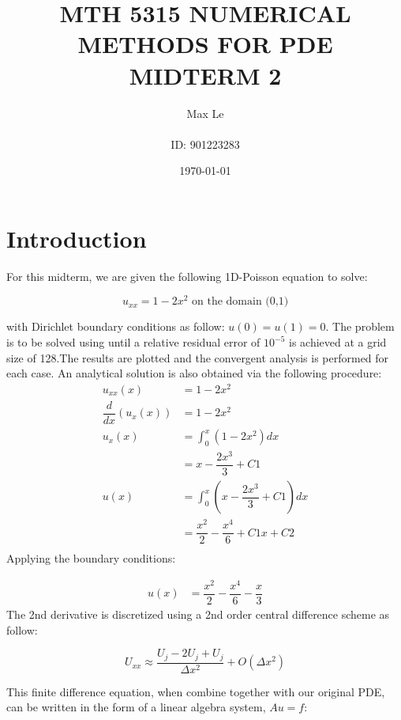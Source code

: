 \documentclass{article}
\title{MTH 5315 NUMERICAL METHODS FOR PDE \\ MIDTERM 2}
\date{\today}
\author{\Huge Max Le \\ \\ ID: 901223283}
\begin{document}
\maketitle
\newpage
\tableofcontents
\newpage
\listoffigures

\newpage
\section{Introduction}
For this midterm, we are given the following 1D-Poisson equation to solve:

\begin{equation}
u_{xx} = 1-2x^2 \textrm{ on the domain (0,1)}
\end{equation}

\noindent
with Dirichlet boundary conditions as follow: $u(0) = u(1) = 0$. The problem is to be solved using until a relative residual error of $10^{-5}$ is achieved at a grid size of 128.The results are plotted and the convergent analysis is performed for each case. An analytical solution is also obtained via the following procedure:
\begin{align*}
u_{xx}(x) &= 1-2x^2 \\
\dfrac{d}{dx}(u_x(x))&= 1-2x^2\\
u_x(x)&= \int_{0}^{x} (1-2x^2) dx\\
&=x-\dfrac{2x^3}{3}+C1\\
u(x) &= \int_{0}^{x} (x-\dfrac{2x^3}{3}+C1) dx\\
&=\dfrac{x^2}{2} - \dfrac{x^4}{6} + C1x + C2\\
\end{align*}
\noindent
Applying the boundary conditions:

\begin{align*}
u(x) &=  \dfrac{x^2}{2} - \dfrac{x^4}{6} - \dfrac{x}{3}
\end{align*} The 2nd derivative is discretized using a 2nd order central difference scheme as follow: 

\begin{equation}
U_{xx} \approx \dfrac{U_j-2U_j+U_j}{\Delta x^2} + O(\Delta x^2)
\end{equation}

\noindent
This finite difference equation, when combine together with our original PDE, can be written in the form of a linear algebra system, $Au = f$: 
\end{document}

